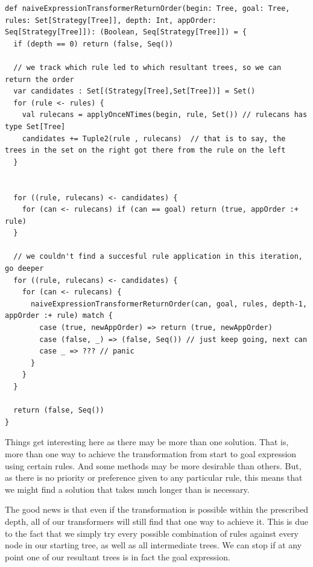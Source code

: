 \documentclass{l4proj}
\begin{document}
\begin{lstlisting}[caption={The same as Listing \ref{lst:naiveExpressionTransformer}, except that it returns the order in which rules are applied if successful}, label={naiveExpressionTransformerReturnOrder}]
def naiveExpressionTransformerReturnOrder(begin: Tree, goal: Tree, rules: Set[Strategy[Tree]], depth: Int, appOrder: Seq[Strategy[Tree]]): (Boolean, Seq[Strategy[Tree]]) = {
  if (depth == 0) return (false, Seq()) 

  // we track which rule led to which resultant trees, so we can return the order
  var candidates : Set[(Strategy[Tree],Set[Tree])] = Set()
  for (rule <- rules) {
    val rulecans = applyOnceNTimes(begin, rule, Set()) // rulecans has type Set[Tree]
    candidates += Tuple2(rule , rulecans)  // that is to say, the trees in the set on the right got there from the rule on the left
  }


  for ((rule, rulecans) <- candidates) {
    for (can <- rulecans) if (can == goal) return (true, appOrder :+ rule)
  }

  // we couldn't find a succesful rule application in this iteration, go deeper
  for ((rule, rulecans) <- candidates) {
    for (can <- rulecans) {
      naiveExpressionTransformerReturnOrder(can, goal, rules, depth-1, appOrder :+ rule) match {
        case (true, newAppOrder) => return (true, newAppOrder)
        case (false, _) => (false, Seq()) // just keep going, next can
        case _ => ??? // panic
      }
    }
  }

  return (false, Seq())
}
\end{lstlisting}

Things get interesting here as there may be more than one solution. That is, more than one way to achieve the transformation from start to goal expression using certain rules. And some methods may be more desirable than others. 
But, as there is no priority or preference given to any particular rule, this means that we might find a solution that takes much longer than is necessary. 

The good news is that even if the transformation is possible within the prescribed depth, all of our transformers will still find that one way to achieve it. This is due to the fact that we simply try every possible combination of rules against every node in our starting tree, as well as all intermediate trees. We can stop if at any point one of our resultant trees is in fact the goal expression.
\end{document}
